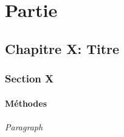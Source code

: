 	
\part{Partie}
 
\chapter{Chapitre X: Titre}

\section{Section X} 

	\subsection{Méthodes} 
		
		\paragraph{Paragraph} 
		